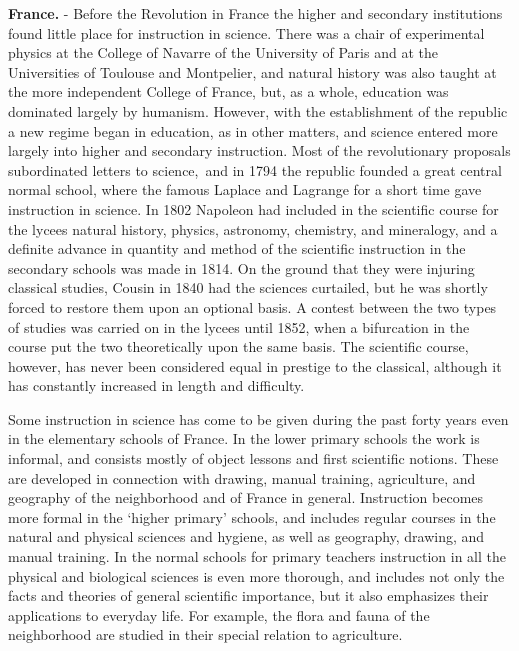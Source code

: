 \documentclass[
]{book}
\begin{document}
\textbf{France.} - Before the Revolution in France the higher and secondary institutions found little place for instruction in science. There was a chair of experimental physics at the College of Navarre of the University of Paris and at the Universities of Toulouse and Montpelier, and natural history was also taught at the more independent College of France, but, as a whole, education was dominated largely by humanism. However, with the establishment of the republic a new regime began in education, as in other matters, and science entered more largely into higher and secondary instruction. Most of the revolutionary proposals subordinated letters to science,~and in 1794 the republic founded a great central normal school, where the famous Laplace and Lagrange for a short time gave instruction in science. In 1802 Napoleon had included in the scientific course for the lycees natural history, physics, astronomy, chemistry, and mineralogy, and a definite advance in quantity and method of the scientific instruction in the secondary schools was made in 1814. On the ground that they were injuring classical studies, Cousin in 1840 had the sciences curtailed, but he was shortly forced to restore them upon an optional basis. A contest between the two types of studies was carried on in the lycees until 1852, when a bifurcation in the course put the two theoretically upon the same basis. The scientific course, however, has never been considered equal in prestige to the classical, although it has constantly increased in length and difficulty.

Some instruction in science has come to be given during the past forty years even in the elementary schools of France. In the lower primary schools the work is informal, and consists mostly of object lessons and first scientific notions. These are developed in connection with drawing, manual training, agriculture, and geography of the neighborhood and of France in general. Instruction becomes more formal in the `higher primary' schools, and includes regular courses in the natural and physical sciences and hygiene, as well as geography, drawing, and manual training. In the normal schools for primary teachers instruction in all the physical and biological sciences is even more thorough, and includes not only the facts and theories of general scientific importance, but it also emphasizes their applications to everyday life. For example, the flora and fauna of the neighborhood are studied in their special relation to agriculture.
\end{document}
